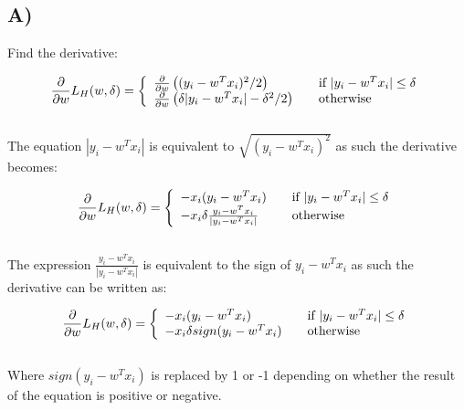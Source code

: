 \documentclass{report}
\begin{document}
\subsection*{A)}
Find the derivative:

\begin{equation}
  \frac{\partial}{\partial w} L_H(w, \delta) = \left\{
  \begin{array}{l l}
    \frac{\partial}{\partial w} \left((y_i - w^Tx_i)^2 / 2 \right)& \quad \text{if }  | y_i - w^Tx_i | \leq \delta\\
    \frac{\partial}{\partial w} \left(\delta | y_i - w^Tx_i | - \delta^2 / 2\right) & \quad \text{otherwise}

  \end{array} \right.\end{equation}
  \\

The equation $| y_i - w^Tx_i |$ is equivalent to $\sqrt{( y_i - w^Tx_i )^2}$ as such
the derivative becomes:

  \begin{equation}
    \frac{\partial}{\partial w} L_H(w, \delta) = \left\{
    \begin{array}{l l}
      - x_i (y_i - w^Tx_i)  & \quad \text{if }  | y_i - w^Tx_i | \leq \delta\\
      - x_i \delta \frac{y_i - w^Tx_i}{| y_i - w^Tx_i |}  & \quad \text{otherwise}

    \end{array} \right.\end{equation}
    \\

The expression $\frac{y_i - w^Tx_i}{| y_i - w^Tx_i |}$ is equivalent to the sign
of $y_i - w^Tx_i$ as such the derivative can be written as:

\begin{equation}
  \frac{\partial}{\partial w} L_H(w, \delta) = \left\{
  \begin{array}{l l}
    - x_i (y_i - w^Tx_i) & \quad \text{if }  | y_i - w^Tx_i | \leq \delta\\
    - x_i \delta sign ( y_i - w^Tx_i ) & \quad \text{otherwise}

  \end{array} \right.\end{equation}
  \\

Where $sign(y_i - w^Tx_i)$ is replaced by 1 or -1 depending on whether the result of the
equation is positive or negative.
\end{document}
